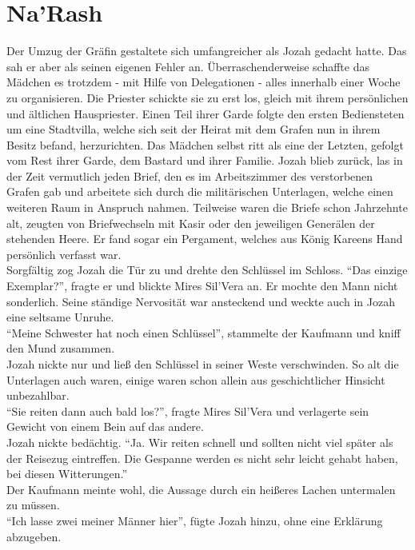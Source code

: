 \chapter{Na'Rash}

Der Umzug der Gräfin gestaltete sich umfangreicher als Jozah gedacht hatte. Das sah er aber als 
seinen eigenen Fehler an. Überraschenderweise schaffte das Mädchen es trotzdem - mit Hilfe von 
Delegationen - alles innerhalb einer Woche zu organisieren. Die Priester schickte sie zu erst los, 
gleich mit ihrem persönlichen und ältlichen Hauspriester. Einen Teil ihrer Garde folgte den ersten 
Bediensteten um eine Stadtvilla, welche sich seit der Heirat mit dem Grafen nun in ihrem Besitz 
befand, herzurichten. Das Mädchen selbst ritt als eine der Letzten, gefolgt vom Rest ihrer Garde, 
dem Bastard und ihrer Familie. Jozah blieb zurück, las in der Zeit vermutlich jeden Brief, den es 
im Arbeitszimmer des verstorbenen Grafen gab und arbeitete sich durch die militärischen Unterlagen, 
welche einen weiteren Raum in Anspruch nahmen. Teilweise waren die Briefe schon Jahrzehnte alt, 
zeugten von Briefwechseln mit Kasir oder den jeweiligen Generälen der stehenden Heere. Er fand 
sogar ein Pergament, welches aus König Kareens Hand persönlich verfasst war.\\
Sorgfältig zog Jozah die Tür zu und drehte den Schlüssel im Schloss. ``Das einzige Exemplar?'', 
fragte er und blickte Mires Sil'Vera an. Er mochte den Mann nicht sonderlich. Seine ständige 
Nervosität war ansteckend und weckte auch in Jozah eine seltsame Unruhe.\\
``Meine Schwester hat noch einen Schlüssel'', stammelte der Kaufmann und kniff den Mund zusammen.\\
Jozah nickte nur und ließ den Schlüssel in seiner Weste verschwinden. So alt die Unterlagen auch 
waren, einige waren schon allein aus geschichtlicher Hinsicht unbezahlbar.\\
``Sie reiten dann auch bald los?'', fragte Mires Sil'Vera und verlagerte sein Gewicht von einem 
Bein auf das andere.\\
Jozah nickte bedächtig. ``Ja. Wir reiten schnell und sollten nicht viel später als der Reisezug 
eintreffen. Die Gespanne werden es nicht sehr leicht gehabt haben, bei diesen Witterungen.''\\
Der Kaufmann meinte wohl, die Aussage durch ein heißeres Lachen untermalen zu müssen.\\
``Ich lasse zwei meiner Männer hier'', fügte Jozah hinzu, ohne eine Erklärung abzugeben.\\
